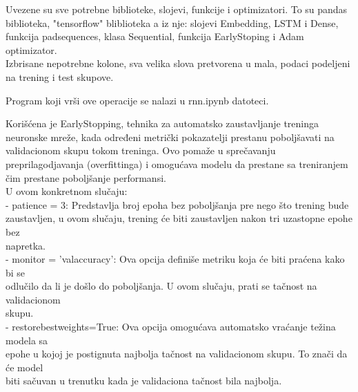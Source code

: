 \documentclass{article}
\begin{document}
\begin{flushleft}

Uvezene su sve potrebne biblioteke, slojevi, funkcije i optimizatori. To su pandas
biblioteka, "tensorflow" bliblioteka a iz nje: slojevi Embedding, LSTM i Dense, 
funkcija pad\textunderscore sequences, klasa Sequential, funkcija EarlyStoping i
Adam optimizator.\\
Izbrisane nepotrebne kolone, sva velika slova pretvorena u mala, podaci podeljeni 
na trening i test skupove.    \\
\vspace{4pt}

Program koji vrši ove operacije se nalazi u rnn.ipynb datoteci.\\ \vspace{1.5mm}

Korišćena je EarlyStopping, tehnika za automatsko zaustavljanje treninga neuronske 
mreže, kada određeni metrički pokazatelji prestanu poboljšavati na validacionom 
skupu tokom treninga. Ovo pomaže u sprečavanju preprilagodjavanja (overfittinga) i
omogućava modelu da prestane sa treniranjem čim prestane poboljšanje performansi.\\


U ovom konkretnom slučaju:\\

\hspace{40pt}- patience = 3: Predstavlja broj epoha bez poboljšanja pre nego što 
trening bude\\ \hspace{44pt} zaustavljen,   u ovom slučaju, trening će biti 
zaustavljen nakon tri uzastopne epohe bez \\ \hspace{47pt}napretka.\\

\hspace{40pt}- monitor = 'val\textunderscore accuracy': Ova opcija definiše metriku 
koja će biti praćena kako bi se \\ \hspace{47pt}odlučilo da li je došlo do 
poboljšanja. U ovom slučaju, prati se tačnost na validacionom \\ 
\hspace{47pt}skupu.\\

\hspace{40pt}- restore\textunderscore best\textunderscore weights=True: Ova opcija 
omogućava automatsko vraćanje težina modela sa \\ \hspace{46pt}epohe u kojoj je 
postignuta najbolja tačnost na validacionom skupu. To znači da će model \\ 
\hspace{46pt}biti sačuvan u trenutku kada je validaciona tačnost bila najbolja.\\


\end{flushleft}
\end{document}
